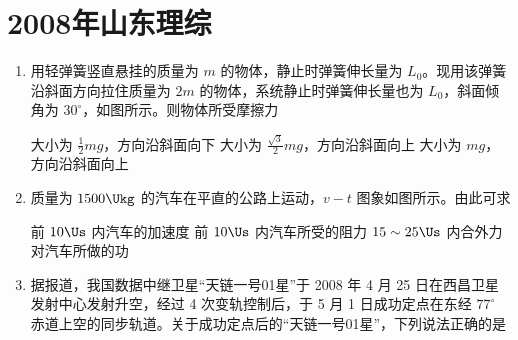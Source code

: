 \documentclass[\gkver]{gaokaozhenti}
\begin{document}
\chapter{2008年山东理综}

\begin{enumerate}
\item
用轻弹簧竖直悬挂的质量为 $m$ 的物体，静止时弹簧伸长量为 $L_{0}$。现用该弹簧沿斜面方向拉住质量为 $2m$ 的物体，系统静止时弹簧伸长量也为 $L_{0}$，斜面倾角为 $30^{\circ}$，如图所示。则物体所受摩擦力


{大小为 $\frac{1}{2}mg$，方向沿斜面向下}
{大小为 $\frac{\sqrt{3}}{2}mg$，方向沿斜面向上}
{大小为 $mg$，方向沿斜面向上}


\item
质量为 $1500\Ukg$ 的汽车在平直的公路上运动，$v-t$ 图象如图所示。由此可求


{前 $10\Us$ 内汽车的加速度}
{前 $10\Us$ 内汽车所受的阻力}
{$15\sim25\Us$ 内合外力对汽车所做的功}


\item
据报道，我国数据中继卫星“天链一号01星”于 2008 年 4 月 25 日在西昌卫星发射中心发射升空，经过 4 次变轨控制后，于 5 月 1 日成功定点在东经 $77^{\circ}$ 赤道上空的同步轨道。关于成功定点后的“天链一号01星”，下列说法正确的是


\end{enumerate}
\end{document}

